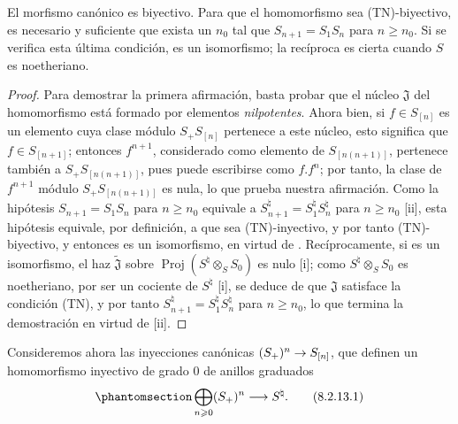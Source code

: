 \documentclass[oneside,10pt]{amsart}
\makeatletter
\renewcommand{\geq}{\geqslant}
\newcommand{\ega@arrow}[2]{\mathchoice{#1}{#2}{#2}{#2}}
\renewcommand{\to}{\ega@arrow{\longrightarrow}{\rightarrow}}
\newcommand{\oldpage}[2][]{\marginnote{\normalfont\footnotesize\textbf{#1}~|~#2}\ignorespaces}
\let\EGAOriginalLabel\label
\renewcommand{\label}[1]{\phantomsection\EGAOriginalLabel{#1}}
\makeatother
\begin{document}
\oldpage[II]{161}
\begin{proposition}[8.2.12]
\label{II.8.2.12-fr}
El morfismo canónico  es biyectivo.
Para que el homomorfismo  sea \textup{(TN)}-biyectivo, es necesario y suficiente que exista un $n_0$ tal que $S_{n+1}=S_1S_n$ para $n\geq n_0$.
Si se verifica esta última condición,  es un isomorfismo;
la recíproca es cierta cuando $S$ es noetheriano.
\end{proposition}

\begin{proof}
Para demostrar la primera afirmación, basta  probar que el núcleo $\mathfrak{J}$ del homomorfismo  está formado por elementos \emph{nilpotentes}.
Ahora bien, si $f\in S_{[n]}$ es un elemento cuya clase módulo $S_+S_{[n]}$ pertenece a este núcleo, esto significa que $f\in S_{[n+1]}$;
entonces $f^{n+1}$, considerado como elemento de $S_{[n(n+1)]}$, pertenece también a $S_+S_{[n(n+1)]}$, pues puede escribirse como $f.f^n$;
por tanto, la clase de $f^{n+1}$ módulo $S_+S_{[n(n+1)]}$ es nula, lo que prueba nuestra afirmación.
Como la hipótesis $S_{n+1}=S_1S_n$ para $n\geq n_0$ equivale a $S_{n+1}^{\natural}=S_1^{\natural}S_n^{\natural}$ para $n\geq n_0$ [ii], esta hipótesis equivale, por definición, a que  sea (TN)-inyectivo, y por tanto (TN)-biyectivo, y entonces  es un isomorfismo, en virtud de .
Recíprocamente, si  es un isomorfismo, el haz $\widetilde{\mathfrak{J}}$ sobre $\operatorname{Proj}(S^{\natural}\otimes_S S_0)$ es nulo [i];
como $S^{\natural}\otimes_S S_0$ es noetheriano, por ser un cociente de $S^{\natural}$ [i], se deduce de  que $\mathfrak{J}$ satisface la condición (TN), y por tanto $S_{n+1}^{\natural}=S_1^{\natural}S_n^{\natural}$ para $n\geq n_0$, lo que termina la demostración en virtud de [ii].
\end{proof}

\begin{env}[8.2.13]
\label{II.8.2.13-fr}
Consideremos ahora las inyecciones canónicas $(S_+)^n\to S_{[n]}$, que definen un homomorfismo inyectivo de grado $0$ de anillos graduados
\begin{equation}
\label{II.8.2.13.1-fr}
  \bigoplus_{n\geq0}(S_+)^n\to S^{\natural}.
\tag{8.2.13.1}
\end{equation}
\end{env}
\end{document}
